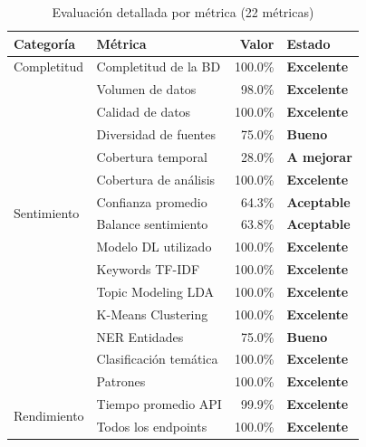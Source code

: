 \documentclass[11pt,a4paper]{article}
\begin{document}
\begin{table}[H]
\centering
\begin{tabularx}{\textwidth}{l X r l}
\toprule
\textbf{Categoría} & \textbf{Métrica} & \textbf{Valor} & \textbf{Estado} \\
\midrule
Completitud & Completitud de la BD & 100.0\% & \textcolor{successgreen}{\textbf{Excelente}} \\
\midrule
\rowcolor{tablerow}
\multirow{4}{*}{Recolección} & Volumen de datos & 98.0\% & \textcolor{successgreen}{\textbf{Excelente}} \\
\rowcolor{tablerow}
  & Calidad de datos & 100.0\% & \textcolor{successgreen}{\textbf{Excelente}} \\
\rowcolor{tablerow}
  & Diversidad de fuentes & 75.0\% & \textcolor{successgreen}{\textbf{Bueno}} \\
\rowcolor{tablerow}
  & Cobertura temporal & 28.0\% & \textcolor{warningorange}{\textbf{A mejorar}} \\
\midrule
\multirow{4}{*}{Sentimiento} & Cobertura de análisis & 100.0\% & \textcolor{successgreen}{\textbf{Excelente}} \\
  & Confianza promedio & 64.3\% & \textcolor{warningorange}{\textbf{Aceptable}} \\
  & Balance sentimiento & 63.8\% & \textcolor{warningorange}{\textbf{Aceptable}} \\
  & Modelo DL utilizado & 100.0\% & \textcolor{successgreen}{\textbf{Excelente}} \\
\midrule
\rowcolor{tablerow}
\multirow{6}{*}{NLP / ML} & Keywords TF-IDF & 100.0\% & \textcolor{successgreen}{\textbf{Excelente}} \\
\rowcolor{tablerow}
  & Topic Modeling LDA & 100.0\% & \textcolor{successgreen}{\textbf{Excelente}} \\
\rowcolor{tablerow}
  & K-Means Clustering & 100.0\% & \textcolor{successgreen}{\textbf{Excelente}} \\
\rowcolor{tablerow}
  & NER Entidades & 75.0\% & \textcolor{successgreen}{\textbf{Bueno}} \\
\rowcolor{tablerow}
  & Clasificación temática & 100.0\% & \textcolor{successgreen}{\textbf{Excelente}} \\
\rowcolor{tablerow}
  & Patrones & 100.0\% & \textcolor{successgreen}{\textbf{Excelente}} \\
\midrule
\multirow{2}{*}{Rendimiento} & Tiempo promedio API & 99.9\% & \textcolor{successgreen}{\textbf{Excelente}} \\
  & Todos los endpoints & 100.0\% & \textcolor{successgreen}{\textbf{Excelente}} \\
\bottomrule
\end{tabularx}
\caption{Evaluación detallada por métrica (22 métricas)}
\end{table}
\end{document}
